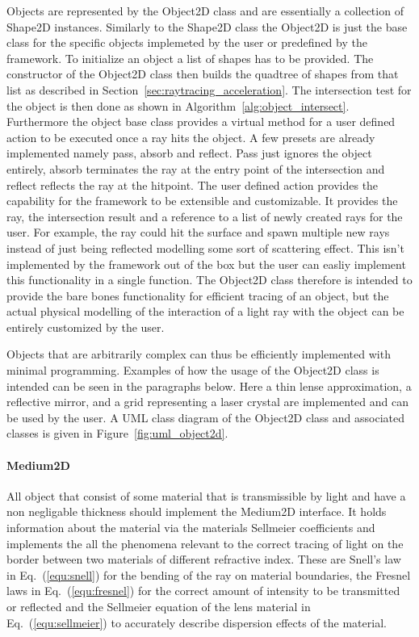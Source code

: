 \documentclass[a4paper,10pt]{article}
\newcommand{\equref}[1]{Eq.~(\ref{#1})}
\newcommand{\secref}[1]{Section~\ref{#1}}
\newcommand{\figref}[1]{Figure~\ref{#1}}
\newcommand{\algref}[1]{Algorithm~\ref{#1}}
\begin{document}
    Objects are represented by the Object2D class and are essentially a collection of
    Shape2D instances. 
    Similarly to the Shape2D class the Object2D is just the base class
    for the specific objects implemeted by the user or predefined by
    the framework.
    To initialize an object a list of shapes has to be provided.
    The constructor of the Object2D class then builds the quadtree
    of shapes from that list as described in 
    \secref{sec:raytracing_acceleration}.
    The intersection test for the object is then done as shown in
    \algref{alg:object_intersect}.
    Furthermore the object base class provides a virtual method 
    for a user defined action to be executed once a ray hits the
    object.
    A few presets are already implemented namely pass, absorb and reflect.
    Pass just ignores the object entirely, absorb terminates the ray at the
    entry point of the intersection and reflect reflects the ray at the
    hitpoint.
    The user defined action provides the capability for the framework to
    be extensible and customizable.
    It provides the ray, the intersection result and a reference to a
    list of newly created rays for the user.
    For example, the ray could hit the surface and spawn multiple
    new rays instead of just being reflected modelling
    some sort of scattering effect.
    This isn't implemented by the framework out of the box but
    the user can easliy implement this functionality in a single
    function.
    The Object2D class therefore is intended to provide the bare bones
    functionality for efficient tracing of an object, but the
    actual physical modelling of the interaction of a light ray
    with the object can be entirely customized by the user.

    Objects that are arbitrarily complex can thus be efficiently
    implemented with minimal programming.
    Examples of how the usage of the Object2D class is intended can
    be seen in the paragraphs below.
    Here a thin lense approximation, a reflective mirror, and a grid
    representing a laser crystal are implemented and can be used by
    the user.
    A UML class diagram of the Object2D class and associated
    classes is given in \figref{fig:uml_object2d}.

    \paragraph{Medium2D}
    All object that consist of some material that is transmissible by
    light and have a non negligable thickness should implement the
    Medium2D interface.
    It holds information about the material via the materials
    Sellmeier coefficients and implements the all the phenomena
    relevant to the correct tracing of light on the border
    between two materials of different refractive index. 
    These are Snell's law in \equref{equ:snell} for the bending of the ray on material
    boundaries, the Fresnel laws in \equref{equ:fresnel} for the
    correct amount of intensity to be transmitted or reflected and
    the Sellmeier equation of the lens material in \equref{equ:sellmeier}
    to accurately describe dispersion effects of the material.
\end{document}
